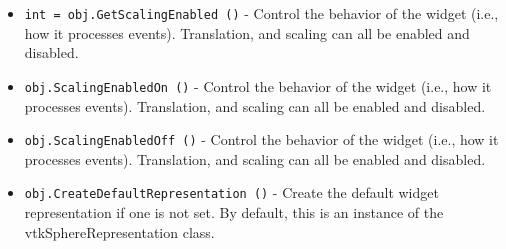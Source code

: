 \begin{itemize}
\item  \verb|int = obj.GetScalingEnabled ()| -  Control the behavior of the widget (i.e., how it processes
 events). Translation, and scaling can all be enabled and disabled.

\item  \verb|obj.ScalingEnabledOn ()| -  Control the behavior of the widget (i.e., how it processes
 events). Translation, and scaling can all be enabled and disabled.

\item  \verb|obj.ScalingEnabledOff ()| -  Control the behavior of the widget (i.e., how it processes
 events). Translation, and scaling can all be enabled and disabled.

\item  \verb|obj.CreateDefaultRepresentation ()| -  Create the default widget representation if one is not set. By default,
 this is an instance of the vtkSphereRepresentation class.

\end{itemize}
